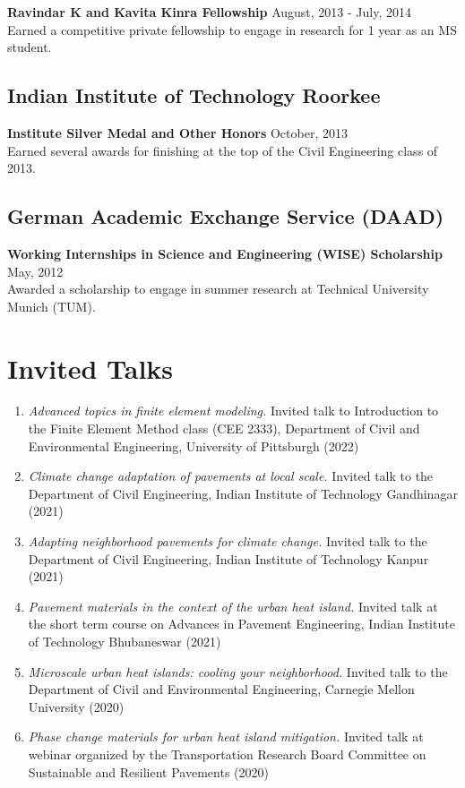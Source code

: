 \documentclass[12pt]{article}
\begin{document}
\textbf{Ravindar K and Kavita Kinra Fellowship} \hfill August, 2013 - July, 2014 \\
Earned a competitive private fellowship to engage in research for 1 year as an MS student. \\

\subsection*{Indian Institute of Technology Roorkee} 
\textbf{Institute Silver Medal and Other Honors} \hfill October, 2013 \\
Earned several awards for finishing at the top of the Civil Engineering class of 2013. \\

\subsection*{German Academic Exchange Service (DAAD)}
\textbf{Working Internships in Science and Engineering (WISE) Scholarship} \hfill May, 2012 \\
Awarded a scholarship to engage in summer research at Technical University Munich (TUM). 

\bigskip
\section*{Invited Talks}
\hfill
\begin{enumerate}[label=(N\arabic*)]
	\item \textit{Advanced topics in finite element modeling.} Invited talk to Introduction to the Finite Element Method class (CEE 2333), Department of Civil and Environmental Engineering, University of Pittsburgh (2022)
	\item \textit{Climate change adaptation of pavements at local scale.} Invited talk to the Department of Civil Engineering, Indian Institute of Technology Gandhinagar (2021)	
	\item \textit{Adapting neighborhood pavements for climate change.} Invited talk to the Department of Civil Engineering, Indian Institute of Technology Kanpur (2021)	
	\item \textit{Pavement materials in the context of the urban heat island.} Invited talk at the short term course on Advances in Pavement Engineering, Indian Institute of Technology Bhubaneswar (2021)	
	\item \textit{Microscale urban heat islands: cooling your neighborhood.} Invited talk to the Department of Civil and Environmental Engineering, Carnegie Mellon University (2020)
	\item \textit{Phase change materials for urban heat island mitigation.} Invited talk at webinar organized by the Transportation Research Board Committee on Sustainable and Resilient Pavements (2020)
\end{enumerate}
\end{document}
